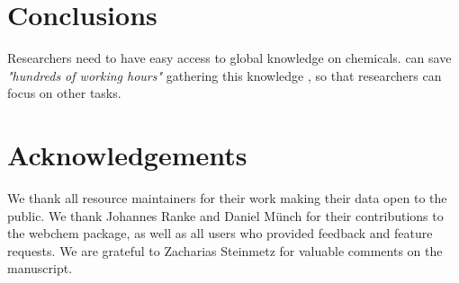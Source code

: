 \documentclass[article, shortnames]{jss}\usepackage[]{graphicx}\usepackage[]{color}
\begin{document}
\section[Conclusions]{Conclusions}
Researchers need to have easy access to global knowledge on chemicals.
 can save \emph{"hundreds of working hours"} gathering this knowledge \citep{Munch_Galizia_2016}, so that researchers can focus on other tasks.


\section*{Acknowledgements}
We thank all resource maintainers for their work making their data open to the public.
We thank Johannes Ranke and Daniel Münch for their contributions to the webchem package, as well as all users who provided feedback and feature requests. 
We are grateful to Zacharias Steinmetz for valuable comments on the manuscript.



\end{document}
